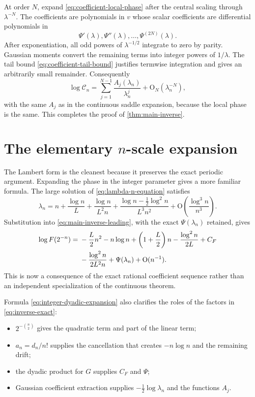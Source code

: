 \documentclass[11pt,oneside]{article}
\theoremstyle{definition}
\theoremstyle{remark}
\newcommand{\bigO}{\mathrm O}
\newcommand{\CoeffMass}{\mathcal C}
\begin{document}
At order $N$, expand \eqref{eq:coefficient-local-phase} after the central scaling through
$\lambda^{-N}$.  The coefficients are polynomials in $v$ whose scalar coefficients are differential polynomials in
\begin{equation}
 \Psi'(\lambda),\Psi''(\lambda),\ldots,\Psi^{(2N)}(\lambda).
\end{equation}
After exponentiation, all odd powers of $\lambda^{-1/2}$ integrate to zero by parity.  Gaussian moments convert the remaining terms into integer powers of $1/\lambda$.  The tail bound \eqref{eq:coefficient-tail-bound} justifies termwise integration and gives an arbitrarily small remainder.  Consequently
\begin{equation}
 \log\CoeffMass_n=
 \sum_{j=1}^{N-1}\frac{A_j(\lambda_n)}{\lambda_n^j}
 +\bigO_N(\lambda_n^{-N}),
\label{eq:Cn-all-orders}
\end{equation}
with the same $A_j$ as in the continuous saddle expansion, because the local phase is the same.  This completes the proof of \cref{thm:main-inverse}.

\section{The elementary $n$-scale expansion}
\label{sec:n-scale}

The Lambert form is the cleanest because it preserves the exact periodic argument.  Expanding the phase in the integer parameter gives a more familiar formula.  The large solution of
\eqref{eq:lambda-n-equation} satisfies
\begin{equation}
 \lambda_n=n+\frac{\log n}{L}
 +\frac{\log n}{L^2n}
 +\frac{\log n-\tfrac12\log^2n}{L^3n^2}
 +\bigO\!\left(\frac{\log^3n}{n^3}\right).
\label{eq:lambda-n-expansion}
\end{equation}
Substitution into \eqref{eq:main-inverse-leading}, with the exact
$\Psi(\lambda_n)$ retained, gives
\begin{align}
 \log F(2^{-n})
 ={}&-\frac L2n^2-n\log n+
 \left(1+\frac L2\right)n
 -\frac{\log^2n}{2L}+C_F                              \notag\\
 &-\frac{\log^2n}{2L^2n}
 +\Psi(\lambda_n)+\bigO(n^{-1}).
\label{eq:integer-dyadic-expansion}
\end{align}
This is now a consequence of the exact rational coefficient sequence rather than an independent specialization of the continuous theorem.

Formula \eqref{eq:integer-dyadic-expansion} also clarifies the roles of the factors in
\eqref{eq:inverse-exact}:
\begin{itemize}
\item $2^{-\binom n2}$ gives the quadratic term and part of the linear term;
\item $a_n=d_n/n!$ supplies the cancellation that creates $-n\log n$ and the remaining drift;
\item the dyadic product for $G$ supplies $C_F$ and $\Psi$;
\item Gaussian coefficient extraction supplies $-\tfrac12\log\lambda_n$ and the functions $A_j$.
\end{itemize}
\end{document}
